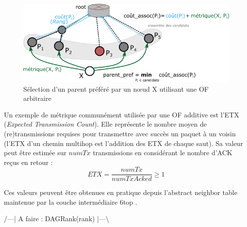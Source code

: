 \documentclass[]{report}
\newcommand{\todo}[1]{\par{\color{red} /---| A faire : #1 |---\textbackslash\\}}
\begin{document}
	\begin{figure}[!h]
	\centering
	\includegraphics[width=0.85\linewidth]{OF_sel_parent}
	\caption{Sélection d'un parent préféré par un nœud X utilisant une OF arbitraire}
	\label{fig:OF}
	\end{figure}

\par Un exemple de métrique communément utilisée par une OF additive est l'ETX (\textit{Expected Transmission Count}). Elle représente le nombre moyen de (re)transmissions requises pour transmettre avec succès un paquet à un voisin (l'ETX d'un chemin multihop est l'addition des ETX de chaque saut). Sa valeur peut être estimée sur $numTx$ transmissions en considérant le nombre d'ACK reçus en retour : 
\begin{equation}
ETX = \frac{numTx}{numTxAcked} \geq 1
\end{equation}

\noindent Ces valeurs peuvent être obtenues en pratique depuis l'abstract neighbor table maintenue par la couche intermédiaire 6top \cite{ietf-6tisch-architecture-28}.

\newpage

\todo{DAGRank(rank)}
\end{document}
